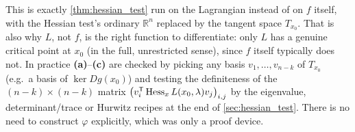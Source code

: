 \begin{remark}
This is exactly \cref{thm:hessian_test} run on the Lagrangian instead of on $f$ itself, with the
Hessian test's ordinary $\mathbb{R}^n$ replaced by the tangent space $T_{x_0}$. That is also why
$L$, not $f$, is the right function to differentiate: only $L$ has a genuine critical point at
$x_0$ (in the full, unrestricted sense), since $f$ itself typically does not. In practice
\textbf{(a)}--\textbf{(c)} are checked by picking any basis $v_1,\dots,v_{n-k}$ of $T_{x_0}$
(e.g.\ a basis of $\ker Dg(x_0)$) and testing the definiteness of the $(n-k)\times(n-k)$ matrix
$\big(v_i^{\mathsf{T}}\operatorname{Hess}_xL(x_0,\lambda)v_j\big)_{i,j}$ by the eigenvalue, determinant/trace or
Hurwitz recipes at the end of \cref{sec:hessian_test}. There is no need to construct $\varphi$
explicitly, which was only a proof device.
\end{remark}

